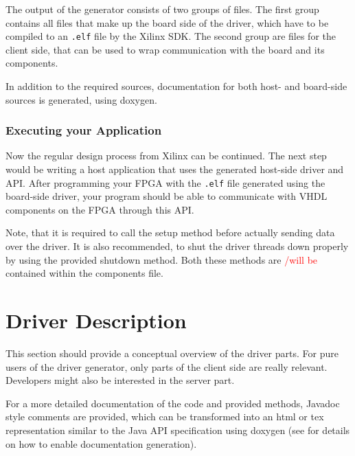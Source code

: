 \documentclass{report}
\begin{document}
The output of the generator consists of two groups of files. The first group contains all files that make up the board side of the driver, which have to be compiled to an \texttt{.elf} file by the Xilinx SDK. The second group are files for the client side, that can be used to wrap communication with the board and its components.

In addition to the required sources, documentation for both host- and board-side sources is generated, using doxygen.

\subsection{Executing your Application}
Now the regular design process from Xilinx can be continued. The next step would be writing a host application that uses the generated host-side driver and API. After programming your FPGA with the \texttt{.elf} file generated using the board-side driver, your program should be able to communicate with VHDL components on the FPGA through this API.

Note, that it is required to call the setup method before actually sending data over the driver. It is also recommended, to shut the driver threads down properly by using the provided shutdown method. Both these methods are \textcolor{red}{/will be} contained within the components file.

\chapter{Driver Description}
This section should provide a conceptual overview of the driver parts. For pure users of the driver generator, only parts of the client side are really relevant. Developers might also be interested in the server part.

For a more detailed documentation of the code and provided methods, Javadoc style comments are provided, which can be transformed into an html or tex representation similar to the Java API specification using doxygen (see  for details on how to enable documentation generation).
\end{document}
